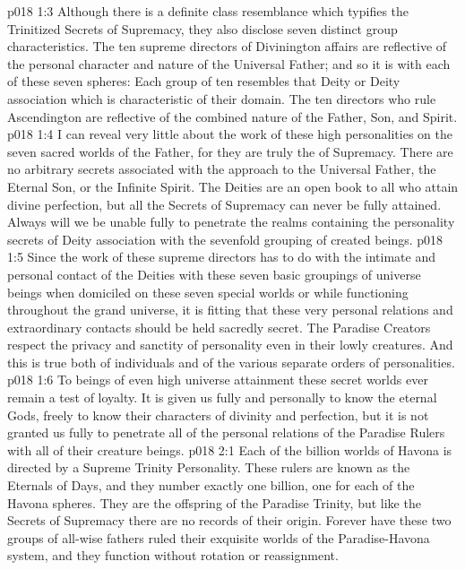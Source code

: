 \vs p018 1:3 Although there is a definite class resemblance which typifies the Trinitized Secrets of Supremacy, they also disclose seven distinct group characteristics. The ten supreme directors of Divinington affairs are reflective of the personal character and nature of the Universal Father; and so it is with each of these seven spheres: Each group of ten resembles that Deity or Deity association which is characteristic of their domain. The ten directors who rule Ascendington are reflective of the combined nature of the Father, Son, and Spirit.
\pc \vs p018 1:4 I can reveal very little about the work of these high personalities on the seven sacred worlds of the Father, for they are truly the  of Supremacy. There are no arbitrary secrets associated with the approach to the Universal Father, the Eternal Son, or the Infinite Spirit. The Deities are an open book to all who attain divine perfection, but all the Secrets of Supremacy can never be fully attained. Always will we be unable fully to penetrate the realms containing the personality secrets of Deity association with the sevenfold grouping of created beings.\plusone
\vs p018 1:5 Since the work of these supreme directors has to do with the intimate and personal contact of the Deities with these seven basic groupings of universe beings when domiciled on these seven special worlds or while functioning throughout the grand universe, it is fitting that these very personal relations and extraordinary contacts should be held sacredly secret. The Paradise Creators respect the privacy and sanctity of personality even in their lowly creatures. And this is true both of individuals and of the various separate orders of personalities.
\vs p018 1:6 To beings of even high universe attainment these secret worlds ever remain a test of loyalty. It is given us fully and personally to know the eternal Gods, freely to know their characters of divinity and perfection, but it is not granted us fully to penetrate all of the personal relations of the Paradise Rulers with all of their creature beings.
\vs p018 2:1 Each of the billion worlds of Havona is directed by a Supreme Trinity Personality. These rulers are known as the Eternals of Days, and they number exactly one billion, one for each of the Havona spheres. They are the offspring of the Paradise Trinity, but like the Secrets of Supremacy there are no records of their origin. Forever have these two groups of all\hyp{}wise fathers ruled their exquisite worlds of the Paradise\hyp{}Havona system, and they function without rotation or reassignment.
